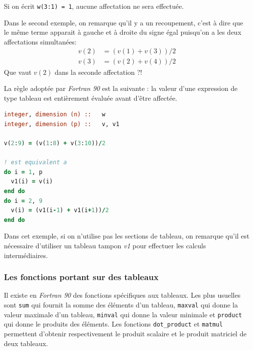 \documentclass[a4paper,twoside]{article}
\begin{document}
\begin{remarque}
Si on écrit \texttt{w(3:1) = 1}, aucune affectation ne sera effectuée.
\end{remarque}

Dans le second exemple, on remarque qu'il y a un recoupement, c'est à dire que le même terme apparait à gauche et à droite du signe égal puisqu'on a les deux affectations \og simultanées\fg :
\begin{align*}
v(2) &= (v(1)+v(3))/2\\
v(3) &= (v(2)+v(4))/2
\end{align*}
Que vaut $v(2)$ dans la seconde affectation ?! 

\begin{important}
La règle adoptée par \emph{Fortran 90} est la suivante : la valeur d'une expression de type tableau est entièrement évaluée avant d'être affectée. 
\end{important}

\begin{lstlisting}[language=Fortran]
integer, dimension (n) ::   w
integer, dimension (p) ::   v, v1

v(2:9) = (v(1:8) + v(3:10))/2

! est equivalent a
do i = 1, p
  v1(i) = v(i)
end do
do i = 2, 9
  v(i) = (v1(i-1) + v1(i+1))/2
end do
\end{lstlisting}

Dans cet exemple, si on n'utilise pas les sections de tableau, on remarque qu'il est nécessaire d'utiliser un tableau tampon \emph{v1} pour effectuer les calculs intermédiaires. 

\subsubsection{Les fonctions portant sur des tableaux}

Il existe en \emph{Fortran 90} des fonctions spécifiques aux tableaux. Les plus usuelles sont \texttt{sum} qui fournit la somme des éléments d'un tableau, \texttt{maxval} qui donne la valeur maximale d'un tableau, \texttt{minval} qui donne la valeur minimale et \texttt{product} qui donne le produits des éléments. Les fonctions \texttt{dot\_product} et \texttt{matmul} permettent d'obtenir respectivement le produit scalaire et le produit matriciel de deux tableaux.
\end{document}
